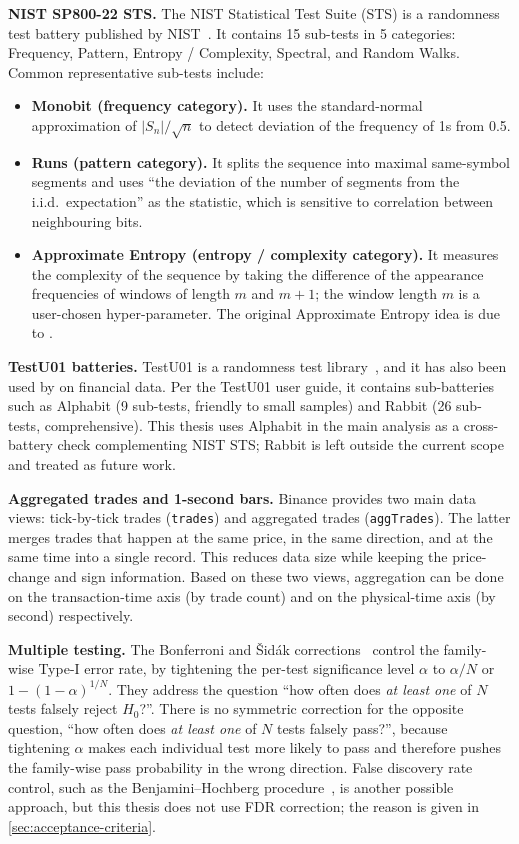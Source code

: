\documentclass[11pt,titlepage,openany,oneside]{book}  %
\begin{document}
\textbf{NIST SP800-22 STS.} The NIST Statistical Test Suite (STS) is a randomness test battery published by NIST~\citep{bassham2010sp80022}. It contains 15 sub-tests in 5 categories: Frequency, Pattern, Entropy / Complexity, Spectral, and Random Walks. Common representative sub-tests include:
\begin{itemize}
\item \textbf{Monobit (frequency category).} It uses the standard-normal approximation of $|S_n|/\sqrt{n}$ to detect deviation of the frequency of 1s from 0.5.
\item \textbf{Runs (pattern category).} It splits the sequence into maximal same-symbol segments and uses ``the deviation of the number of segments from the i.i.d.\ expectation'' as the statistic, which is sensitive to correlation between neighbouring bits.
\item \textbf{Approximate Entropy (entropy / complexity category).} It measures the complexity of the sequence by taking the difference of the appearance frequencies of windows of length $m$ and $m + 1$; the window length $m$ is a user-chosen hyper-parameter. The original Approximate Entropy idea is due to \citet{pincus1991apen}.
\end{itemize}

\textbf{TestU01 batteries.} TestU01 is a randomness test library~\citep{lecuyer2007testu01}, and it has also been used by \citet{onofri2025emergence} on financial data. Per the TestU01 user guide, it contains sub-batteries such as Alphabit (9 sub-tests, friendly to small samples) and Rabbit (26 sub-tests, comprehensive). This thesis uses Alphabit in the main analysis as a cross-battery check complementing NIST STS; Rabbit is left outside the current scope and treated as future work.

\textbf{Aggregated trades and 1-second bars.} Binance provides two main data views: tick-by-tick trades (\texttt{trades}) and aggregated trades (\texttt{aggTrades}). The latter merges trades that happen at the same price, in the same direction, and at the same time into a single record. This reduces data size while keeping the price-change and sign information. Based on these two views, aggregation can be done on the transaction-time axis (by trade count) and on the physical-time axis (by second) respectively.

\textbf{Multiple testing.} The Bonferroni and \v{S}id\'ak corrections~\citep{bonferroni1936teoria,sidak1967rectangular} control the family-wise Type-I error rate, by tightening the per-test significance level $\alpha$ to $\alpha/N$ or $1 - (1 - \alpha)^{1/N}$. They address the question ``how often does \emph{at least one} of $N$ tests falsely reject $H_0$?''. There is no symmetric correction for the opposite question, ``how often does \emph{at least one} of $N$ tests falsely pass?'', because tightening $\alpha$ makes each individual test more likely to pass and therefore pushes the family-wise pass probability in the wrong direction. False discovery rate control, such as the Benjamini--Hochberg procedure~\citep{benjamini1995fdr}, is another possible approach, but this thesis does not use FDR correction; the reason is given in \cref{sec:acceptance-criteria}.
\end{document}
